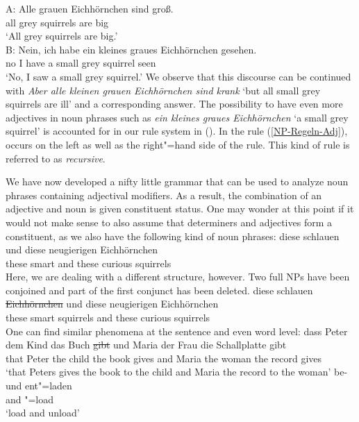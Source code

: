\ea
\label{Beispiel-Iteration-Adjektive}
\gll A: Alle grauen Eichhörnchen sind groß.\\
     {} all grey squirrels are big\\
\glt {}`All grey squirrels are big.'\\
\gll B: Nein, ich habe ein kleines graues Eichhörnchen gesehen.\\
     {} no I have a small grey squirrel seen\\
\glt {}`No, I saw a small grey squirrel.'
\z
We observe that this discourse can be continued with \emph{Aber alle kleinen grauen Eichhörnchen
  sind krank} `but all small grey squirrels are ill' and a corresponding answer. The possibility
  to have even more adjectives in noun phrases such as \emph{ein kleines graues Eichhörnchen} `a
  small grey squirrel' is accounted for in our rule system in (). In the rule
  (\ref{NP-Regeln-Adj}), \nbar occurs on the left as well as the right"=hand 
  side of the rule. This kind of rule is referred to as \emph{recursive}.

We have now developed a nifty little grammar that can be used to analyze noun phrases containing
adjectival modifiers. As a result, the combination of an adjective and noun is given constituent
status. One may wonder at this point if it would not make sense to also assume that determiners and
adjectives form a constituent, as we also have the following kind of noun phrases: 
\ea
\gll diese schlauen und diese neugierigen Eichhörnchen\\
     these smart    and these curious     squirrels\\
\z
Here, we are dealing with a different structure, however. Two full NPs have been
conjoined and part of the first conjunct has been deleted.
\ea
\gll diese schlauen \st{Eichhörnchen} und diese neugierigen Eichhörnchen\\
     these smart    squirrels         and these curious     squirrels\\
\z
One can find similar phenomena at the sentence and even word level:
\eal
\ex 
\gll dass Peter dem Kind das Buch \st{gibt} und Maria der Frau die Schallplatte gibt\\
	 that Peter the child the book gives and Maria the woman the record gives\\
\glt `that Peters gives the book to the child and Maria the record to the woman'
\ex 
\gll be- und ent"=laden\\
	 \prfx{} and \prfx{}"=load\\
\glt `load and unload'
\zl

